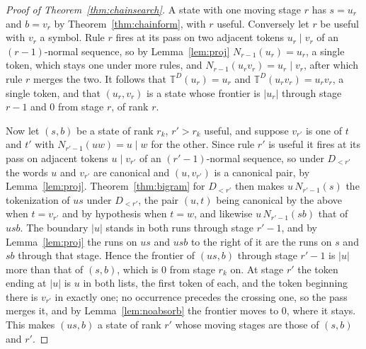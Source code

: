 \documentclass[11pt,a4paper]{article}
\theoremstyle{definition}
\theoremstyle{plain}
\newcommand{\T}{\mathbb{T}}
\begin{document}
\begin{proof}[Proof of Theorem~\ref{thm:chainsearch}]
A state with one moving stage \(r\) has \(s = u_r\) and \(b = v_r\) by Theorem~\ref{thm:chainform}, with \(r\) useful.
Conversely let \(r\) be useful with \(v_r\) a symbol. Rule \(r\) fires at its pass on two adjacent tokens
\(u_r \mid v_r\) of an \((r-1)\)-normal sequence, so by Lemma~\ref{lem:proj} \(N_{r-1}(u_r) = u_r\), a single token,
which stays one under more rules, and \(N_{r-1}(u_r v_r) = u_r \mid v_r\), after which rule \(r\) merges the two. It
follows that \(\T^D(u_r) = u_r\) and \(\T^D(u_r v_r) = u_r v_r\), a single token, and that \((u_r, v_r)\) is a state
whose frontier is \(|u_r|\) through stage \(r - 1\) and \(0\) from stage \(r\), of rank \(r\).

Now let \((s, b)\) be a state of rank \(r_k\), \(r' > r_k\) useful, and suppose \(v_{r'}\) is one of \(t\) and \(t'\)
with \(N_{r'-1}(uw) = u \mid w\) for the other. Since rule \(r'\) is useful it fires at its pass on adjacent tokens
\(u \mid v_{r'}\) of an \((r'-1)\)-normal sequence, so under \(D_{<r'}\) the words \(u\) and \(v_{r'}\) are canonical
and \((u, v_{r'})\) is a canonical pair, by Lemma~\ref{lem:proj}. Theorem~\ref{thm:bigram} for \(D_{<r'}\) then makes
\(u\, N_{r'-1}(s)\) the tokenization of \(us\) under \(D_{<r'}\), the pair \((u, t)\) being canonical by the above when
\(t = v_{r'}\) and by hypothesis when \(t = w\), and likewise \(u\, N_{r'-1}(sb)\) that of \(usb\). The boundary \(|u|\)
stands in both runs through stage \(r' - 1\), and by Lemma~\ref{lem:proj} the runs on \(us\) and \(usb\) to the right of
it are the runs on \(s\) and \(sb\) through that stage. Hence the frontier of \((us, b)\) through stage \(r' - 1\) is
\(|u|\) more than that of \((s, b)\), which is \(0\) from stage \(r_k\) on. At stage \(r'\) the token ending at \(|u|\)
is \(u\) in both lists, the first token of each, and the token beginning there is \(v_{r'}\) in exactly one; no
occurrence precedes the crossing one, so the pass merges it, and by Lemma~\ref{lem:noabsorb} the frontier moves to
\(0\), where it stays. This makes \((us, b)\) a state of rank \(r'\) whose moving stages are those of \((s, b)\) and
\(r'\).


\end{proof}
\end{document}
